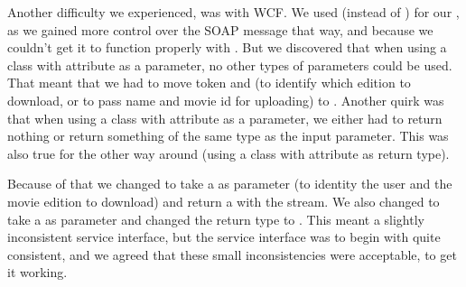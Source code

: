 Another difficulty we experienced, was with WCF. We used  (instead of ) for our , as we gained more control over the SOAP message that way, and because we couldn't get it to function properly with . But we discovered that when using a class with  attribute as a parameter, no other types of parameters could be used. That meant that we had to move token and  (to identify which edition to download, or to pass name and movie id for uploading) to . Another quirk was that when using a class with  attribute as a parameter, we either had to return nothing or return something of the same type as the input parameter. This was also true for the other way around (using a class with  attribute as return type).

Because of that we changed  to take a   as parameter (to identity the user and the movie edition to download) and return a   with the stream. We also changed  to take a  as parameter and changed the return type to . This meant a slightly inconsistent service interface, but the service interface was to begin with quite consistent, and we agreed that these small inconsistencies were acceptable, to get it working.